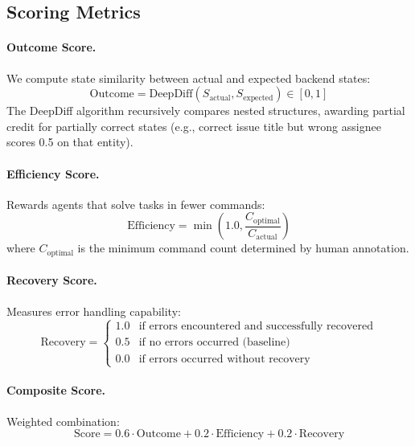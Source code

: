\documentclass{article}
\begin{document}
\subsection{Scoring Metrics}

\paragraph{Outcome Score.} We compute state similarity between actual and expected backend states:
\begin{equation}
\text{Outcome} = \text{DeepDiff}(S_{\text{actual}}, S_{\text{expected}}) \in [0, 1]
\end{equation}
The DeepDiff algorithm recursively compares nested structures, awarding partial credit for partially correct states (e.g., correct issue title but wrong assignee scores 0.5 on that entity).

\paragraph{Efficiency Score.} Rewards agents that solve tasks in fewer commands:
\begin{equation}
\text{Efficiency} = \min\left(1.0, \frac{C_{\text{optimal}}}{C_{\text{actual}}}\right)
\end{equation}
where $C_{\text{optimal}}$ is the minimum command count determined by human annotation.

\paragraph{Recovery Score.} Measures error handling capability:
\begin{equation}
\text{Recovery} = \begin{cases}
1.0 & \text{if errors encountered and successfully recovered} \\
0.5 & \text{if no errors occurred (baseline)} \\
0.0 & \text{if errors occurred without recovery}
\end{cases}
\end{equation}

\paragraph{Composite Score.} Weighted combination:
\begin{equation}
\text{Score} = 0.6 \cdot \text{Outcome} + 0.2 \cdot \text{Efficiency} + 0.2 \cdot \text{Recovery}
\end{equation}
\end{document}
